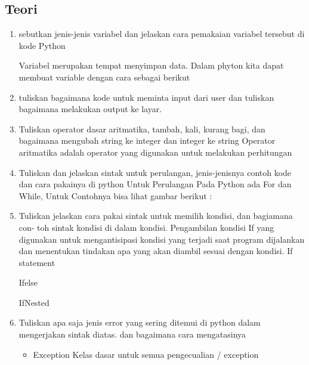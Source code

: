 \subsection{Teori}
\begin{enumerate}
    \item sebutkan jenis-jenis variabel dan jelaskan cara pemakaian variabel tersebut di
    kode Python
    \par
    Variabel merupakan tempat menyimpan data. Dalam phyton kita dapat membuat variable dengan cara sebagai berikut
    

    \item tuliskan bagaimana kode untuk meminta input dari user dan tuliskan bagaimana
    melakukan output ke layar.
    

    \item Tuliskan operator dasar aritmatika, tambah, kali, kurang bagi, dan bagaimana
    mengubah string ke integer dan integer ke string
    Operator  aritmatika adalah operator yang digunakan untuk melakukan perhitungan
    

    \item Tuliskan dan jelaskan sintak untuk perulangan, jenis-jenisnya contoh kode dan
    cara pakainya di python
    Untuk Perulangan Pada Python ada For dan While, Untuk Contohnya bisa lihat gambar berikut :
    

    \item Tuliskan jelaskan cara pakai sintak untuk memilih kondisi, dan bagiamana con-
    toh sintak kondisi di dalam kondisi.
    Pengambilan kondisi If yang digunakan untuk mengantisipasi kondisi yang terjadi saat program dijalankan dan menentukan tindakan apa yang akan diambil sesuai dengan kondisi.
    If statement
    
    
    Ifelse
    
    
    IfNested
    

    \item Tuliskan apa saja jenis error yang sering ditemui di python dalam mengerjakan
    sintak diatas. dan bagaimana cara mengatasinya
    \begin{itemize}
        \item Exception
        Kelas dasar untuk semua pengecualian / exception


\end{itemize}
\end{enumerate}
